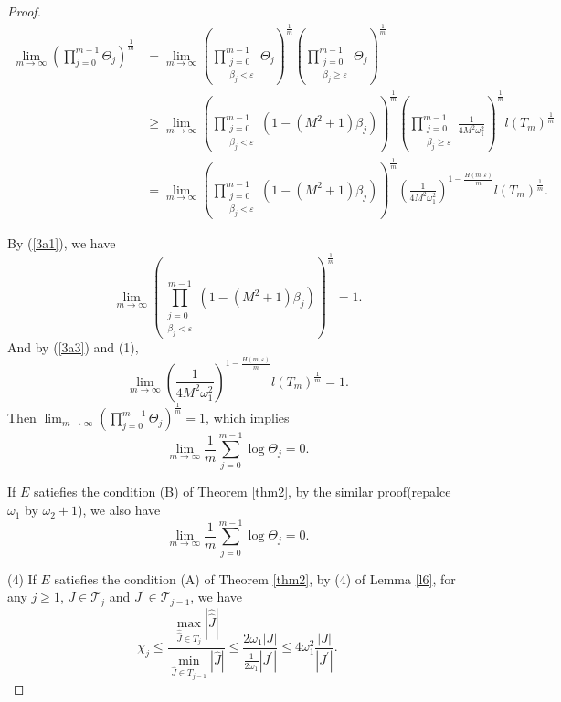 \documentclass[10pt,a4paper]{amsart}
\begin{document}
\begin{proof}
\begin{equation*}
\begin{aligned}
\lim_{m \to \infty} ( \prod_{j  = 0}^{m-1}\Theta_j)^{\frac{1}{m} } & =\lim_{m \to \infty} ( \prod_{\substack{j  = 0\\\beta_j<\varepsilon }}^{m-1}\Theta_j)^{\frac{1}{m} }( \prod_{\substack{j  = 0\\\beta_j\ge\varepsilon }}^{m-1}\Theta_j)^{\frac{1}{m} }\\
&\ge  \lim_{m \to \infty}(\prod_{\substack{j  = 0\\\beta_j<\varepsilon }}^{m-1}(1-(M^2+1)\beta_j))^{\frac{1}{m} }( \prod_{\substack{j  = 0\\\beta_j\ge\varepsilon }}^{m-1}\frac{1}{4M^2\omega_1^2} )^{\frac{1}{m} }l(T_m)^{\frac{1}{m} } \\
&=\lim_{m \to \infty}(\prod_{\substack{j  = 0\\\beta_j<\varepsilon }}^{m-1}(1-(M^2+1)\beta_j))^{\frac{1}{m} }(\frac{1}{4M^2\omega_1^2} )^{1-\frac{H(m,\varepsilon )}{m} }l(T_m)^{\frac{1}{m} }.
\end{aligned}
\end{equation*}

By (\ref{3a1}), we have $$\lim_{m \to \infty}(\prod_{\substack{j  = 0\\\beta_j<\varepsilon }}^{m-1}(1-(M^2+1)\beta_j))^{\frac{1}{m} }=1.$$
And by (\ref{3a3}) and (1), $$\lim_{m \to \infty}(\frac{1}{4M^2\omega_1^2} )^{1-\frac{H(m,\varepsilon )}{m} }l(T_m)^{\frac{1}{m} }=1.$$
Then $\lim_{m \to \infty} ( \prod_{j  = 0}^{m-1}\Theta_j)^{\frac{1}{m} }=1$, which implies
\begin{equation*}
\lim_{m \to \infty}\frac{1}{m} \sum_{j=0}^{m-1}\log \Theta_j=0 .
\end{equation*}




If $E$ satiefies the condition {\rm(B)} of Theorem {\rm\ref{thm2}}, by the similar proof(repalce $\omega_1$ by $\omega_2+1$), we also have
\begin{equation*}
\lim_{m \to \infty}\frac{1}{m} \sum_{j=0}^{m-1}\log \Theta_j=0 .
\end{equation*}




(4) If $E$ satiefies the condition {\rm(A)} of Theorem {\rm\ref{thm2}}, by (4) of Lemma \ref{l6}, for any $j\ge 1$, $J\in \mathcal{T}_j$ and $J^{\prime}\in \mathcal{T}_{j-1}$, we have
\begin{equation*}
\chi_j\le\frac{\max_{\hat{\hat{J}}\in T_j}\left | \hat{\hat{J}} \right | }{\min_{\hat{J}\in T_{j-1}}\left | \hat{J} \right |}\le\frac{2\omega_1\left | J \right | }{\frac{1}{2\omega_1} \left |J^{\prime} \right |}\le 4\omega_1^2\frac{\left | J \right |}{\left |J^{\prime} \right |}.
\end{equation*}



\end{proof}
\end{document}
